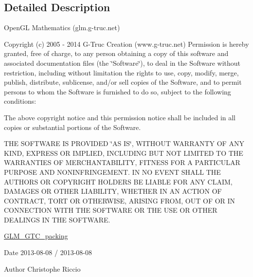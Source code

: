 \subsection{Detailed Description}
Open\+GL Mathematics (glm.\+g-\/truc.\+net)

Copyright (c) 2005 -\/ 2014 G-\/\+Truc Creation (www.\+g-\/truc.\+net) Permission is hereby granted, free of charge, to any person obtaining a copy of this software and associated documentation files (the \char`\"{}\+Software\char`\"{}), to deal in the Software without restriction, including without limitation the rights to use, copy, modify, merge, publish, distribute, sublicense, and/or sell copies of the Software, and to permit persons to whom the Software is furnished to do so, subject to the following conditions\+:

The above copyright notice and this permission notice shall be included in all copies or substantial portions of the Software.

T\+HE S\+O\+F\+T\+W\+A\+RE IS P\+R\+O\+V\+I\+D\+ED \char`\"{}\+A\+S I\+S\char`\"{}, W\+I\+T\+H\+O\+UT W\+A\+R\+R\+A\+N\+TY OF A\+NY K\+I\+ND, E\+X\+P\+R\+E\+SS OR I\+M\+P\+L\+I\+ED, I\+N\+C\+L\+U\+D\+I\+NG B\+UT N\+OT L\+I\+M\+I\+T\+ED TO T\+HE W\+A\+R\+R\+A\+N\+T\+I\+ES OF M\+E\+R\+C\+H\+A\+N\+T\+A\+B\+I\+L\+I\+TY, F\+I\+T\+N\+E\+SS F\+OR A P\+A\+R\+T\+I\+C\+U\+L\+AR P\+U\+R\+P\+O\+SE A\+ND N\+O\+N\+I\+N\+F\+R\+I\+N\+G\+E\+M\+E\+NT. IN NO E\+V\+E\+NT S\+H\+A\+LL T\+HE A\+U\+T\+H\+O\+RS OR C\+O\+P\+Y\+R\+I\+G\+HT H\+O\+L\+D\+E\+RS BE L\+I\+A\+B\+LE F\+OR A\+NY C\+L\+A\+IM, D\+A\+M\+A\+G\+ES OR O\+T\+H\+ER L\+I\+A\+B\+I\+L\+I\+TY, W\+H\+E\+T\+H\+ER IN AN A\+C\+T\+I\+ON OF C\+O\+N\+T\+R\+A\+CT, T\+O\+RT OR O\+T\+H\+E\+R\+W\+I\+SE, A\+R\+I\+S\+I\+NG F\+R\+OM, O\+UT OF OR IN C\+O\+N\+N\+E\+C\+T\+I\+ON W\+I\+TH T\+HE S\+O\+F\+T\+W\+A\+RE OR T\+HE U\+SE OR O\+T\+H\+ER D\+E\+A\+L\+I\+N\+GS IN T\+HE S\+O\+F\+T\+W\+A\+RE.

\hyperlink{group__gtc__packing}{G\+L\+M\+\_\+\+G\+T\+C\+\_\+packing}

\begin{DoxyDate}{Date}
2013-\/08-\/08 / 2013-\/08-\/08 
\end{DoxyDate}
\begin{DoxyAuthor}{Author}
Christophe Riccio 
\end{DoxyAuthor}
